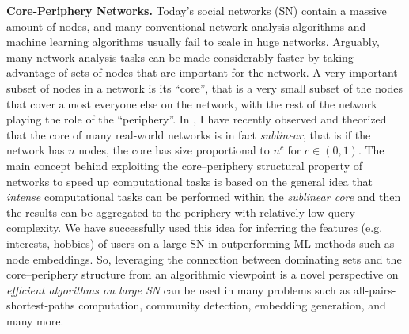 \documentclass[11pt]{article}
\begin{document}

\noindent \textbf{Core-Periphery Networks.} Today's social networks (SN) contain a massive amount of nodes, and many conventional network analysis algorithms and machine learning algorithms usually fail to scale in huge networks. Arguably, many network analysis tasks can be made considerably faster by taking advantage of sets of nodes that are important for the network. A very important subset of nodes in a network is its ``core'', that is a very small  subset of the nodes that cover almost everyone else on the network, with the rest of the network playing the role of the ``periphery''. In \cite{papachristou2021sublinear}, I have recently observed and theorized that the core of many real-world networks is in fact \emph{sublinear}, that is if the network has $n$ nodes, the core has size proportional to $n^c$ for $c \in (0, 1)$. The main concept behind exploiting the core--periphery structural property of networks to speed up computational tasks is based on the general idea that \emph{intense} computational tasks can be performed within the \emph{sublinear core} and then the results can be aggregated to the periphery with relatively low query complexity. We have successfully used this idea for inferring the features (e.g. interests, hobbies) of users on a large SN in \cite{papachristou2021stochastic} outperforming ML methods such as node embeddings.  So, leveraging the connection between dominating sets and the core--periphery structure from an algorithmic viewpoint is   a novel perspective on \emph{efficient algorithms on large SN} can be used in many problems such as all-pairs-shortest-paths computation, community detection, embedding generation, and many more. 




\nocite{*}

{\small


}
\end{document}
